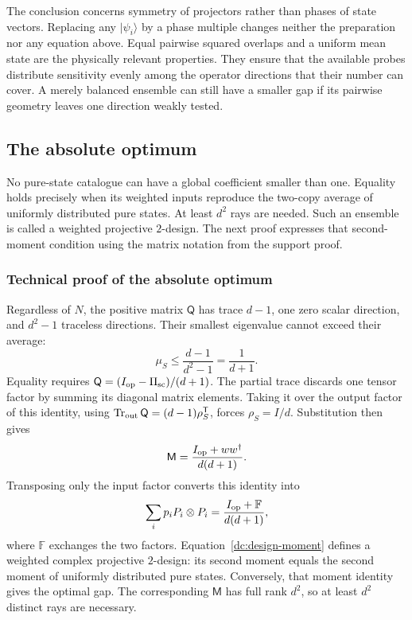 \documentclass[11pt,a4paper]{article}
\newcommand{\ket}[1]{\lvert #1\rangle}
\newcommand{\Tr}{\operatorname{Tr}}
\numberwithin{equation}{section}
\begin{document}
The conclusion concerns symmetry of projectors rather than phases of state
vectors.  Replacing any $\ket{\psi_i}$ by a phase multiple changes neither
the preparation nor any equation above.  Equal pairwise squared overlaps
and a uniform mean state are the physically relevant properties.  They
ensure that the available probes distribute sensitivity evenly among the
operator directions that their number can cover.  A merely balanced
ensemble can still have a smaller gap if its pairwise geometry leaves
one direction weakly tested.

\subsection{The absolute optimum}

No pure-state catalogue can have a global coefficient smaller than one.
Equality holds precisely when its weighted inputs reproduce the two-copy
average of uniformly distributed pure states. At least $d^2$ rays are needed.
Such an ensemble is called a weighted projective $2$-design. The next proof
expresses that second-moment condition using the matrix notation from the
support proof.

\subsubsection*{Technical proof of the absolute optimum}

Regardless of $N$, the positive matrix $\mathsf Q$ has trace $d-1$,
one zero scalar direction, and $d^2-1$ traceless directions.  Their smallest
eigenvalue cannot exceed their average:
\[
 \mu_S\leq\frac{d-1}{d^2-1}=\frac1{d+1}.
\]
Equality requires
$\mathsf Q=(I_{\rm op}-\Pi_{\rm sc})/(d+1)$.  The partial trace discards one tensor factor by summing its diagonal matrix elements. Taking it
over the output factor of this identity, using
$\Tr_{\rm out}\mathsf Q=(d-1)\rho_S^{\mathsf T}$, forces
$\rho_S=I/d$.  Substitution then gives
\[
 \mathsf M=\frac{I_{\rm op}+ww^\dagger}{d(d+1)}.
\]
Transposing only the input factor converts this identity into
\begin{equation}
 \sum_i p_iP_i\otimes P_i=\frac{I_{\rm op}+\mathbb F}{d(d+1)},
 \label{dc:design-moment}
\end{equation}
where $\mathbb F$ exchanges the two factors.  Equation~\eqref{dc:design-moment}
defines a weighted complex projective $2$-design: its second moment equals
the second moment of uniformly distributed pure states.  Conversely, that
moment identity gives the optimal gap.  The corresponding $\mathsf M$ has
full rank $d^2$, so at least $d^2$ distinct rays are necessary.
\end{document}
